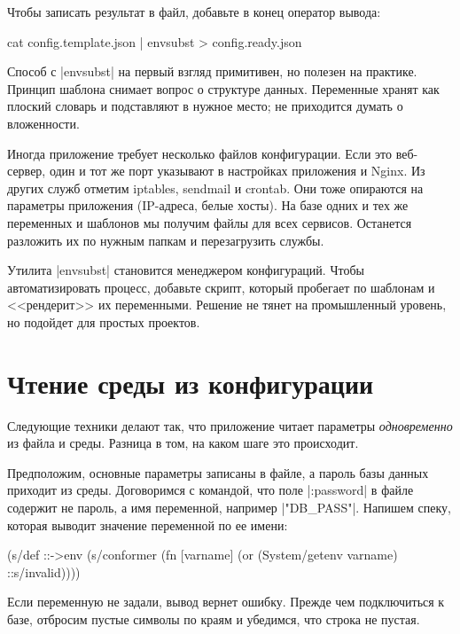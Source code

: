 \noindent
Чтобы записать результат в файл, добавьте в конец оператор вывода:

\begin{english}
  \begin{bash}
cat config.template.json | envsubst > config.ready.json
  \end{bash}
\end{english}

Способ с \spverb|envsubst| на первый взгляд примитивен, но полезен на
практике. Принцип шаблона снимает вопрос о структуре данных. Переменные хранят
как плоский словарь и подставляют в нужное место; не приходится думать о
вложенности.

Иногда приложение требует несколько файлов конфигурации. Если это веб-сервер,
один и тот же порт указывают в настройках приложения и Nginx. Из других служб
отметим iptables, sendmail и crontab. Они тоже опираются на параметры приложения
(IP-адреса, белые хосты). На базе одних и тех же переменных и шаблонов мы
получим файлы для всех сервисов. Останется разложить их по нужным папкам и
перезагрузить службы.

Утилита \spverb|envsubst| становится менеджером конфигураций. Чтобы
автоматизировать процесс, добавьте скрипт, который пробегает по шаблонам и
<<рендерит>> их переменными. Решение не тянет на промышленный уровень, но
подойдет для простых проектов.

\section{Чтение среды из конфигурации}

Следующие техники делают так, что приложение читает параметры
\emph{одновременно} из файла и среды. Разница в том, на каком шаге это
происходит.

Предположим, основные параметры записаны в файле, а пароль базы данных приходит
из среды. Договоримся с командой, что поле \spverb|:password| в файле содержит
не пароль, а имя переменной, например \spverb|"DB_PASS"|. Напишем спеку, которая
выводит значение переменной по ее имени:

\begin{english}
  \begin{clojure}
(s/def ::->env
  (s/conformer
   (fn [varname]
     (or (System/getenv varname)
         ::s/invalid))))
  \end{clojure}
\end{english}

Если переменную не задали, вывод вернет ошибку. Прежде чем подключиться к базе,
отбросим пустые символы по краям и убедимся, что строка не пустая.

